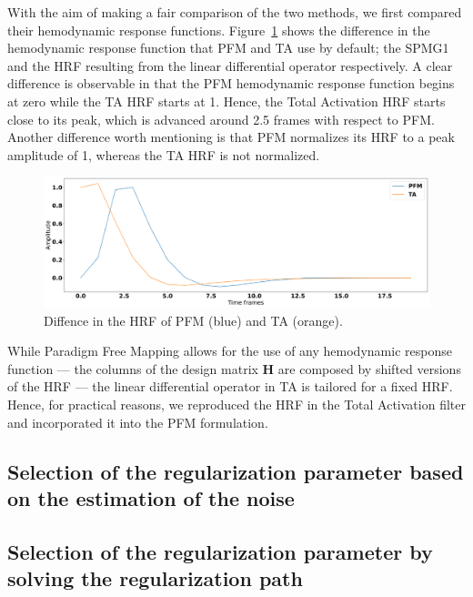 With the aim of making a fair comparison of the two methods, we first compared their hemodynamic response functions. Figure~\ref{fig:hrf_diff} shows the difference in the hemodynamic response function that PFM and TA use by default; the SPMG1 and the HRF resulting from the linear differential operator respectively. A clear difference is observable in that the PFM hemodynamic response function begins at zero while the TA HRF starts at 1. Hence, the Total Activation HRF starts close to its peak, which is advanced around 2.5 frames with respect to PFM. Another difference worth mentioning is that PFM normalizes its HRF to a peak amplitude of 1, whereas the TA HRF is not normalized.

\begin{figure}[h]
    \includegraphics[width=\columnwidth]{figures/hrf_diff.png}
    \caption{Diffence in the HRF of PFM (blue) and TA (orange).}
\label{fig:hrf_diff}
\end{figure}

While Paradigm Free Mapping allows for the use of any hemodynamic response function --- the columns of the design matrix \(\mathbf{H}\) are composed by shifted versions of the HRF --- the linear differential operator in TA is tailored for a fixed HRF. Hence, for practical reasons, we reproduced the HRF in the Total Activation filter and incorporated it into the PFM formulation.

\subsection{Selection of the regularization parameter based on the estimation of the noise}

\subsection{Selection of the regularization parameter by solving the regularization path}


